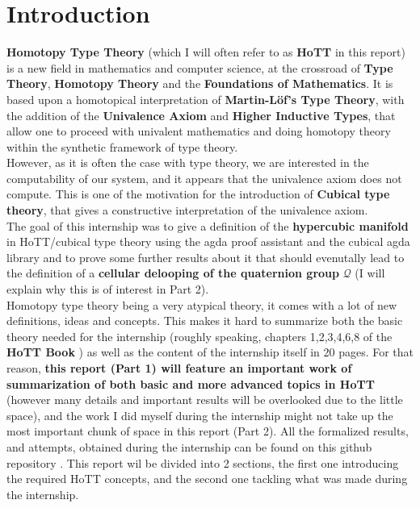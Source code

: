 \documentclass{report}
\begin{document}
\section{Introduction}
\textbf{Homotopy Type Theory} (which I will often refer to as \textbf{HoTT} in this report) is a new field in mathematics and computer science, at the crossroad of \textbf{Type Theory}, \textbf{Homotopy Theory} and the \textbf{Foundations of Mathematics}. It is based upon a homotopical interpretation of \textbf{Martin-Löf's Type Theory}, with the addition of the \textbf{Univalence Axiom} and \textbf{Higher Inductive Types}, that allow one to proceed with univalent mathematics and doing homotopy theory within the synthetic framework of type theory.\\
However, as it is often the case with type theory, we are interested in the computability of our system, and it appears that the univalence axiom does not compute. This is one of the motivation for the introduction of \textbf{Cubical type theory}, that gives a constructive interpretation of the univalence axiom.\\
The goal of this internship was to give a definition of the \textbf{hypercubic manifold} \cite{hypercubic} in HoTT/cubical type theory using the agda proof assistant and the cubical agda library \cite{cubicalagda} and to prove some further results about it that should evenutally lead to the definition of a \textbf{cellular delooping of the quaternion group} $\mathcal Q$ (I will explain why this is of interest in Part 2).\\
Homotopy type theory being a very atypical theory, it comes with a lot of new definitions, ideas and concepts. This makes it hard to summarize both the basic theory needed for the internship (roughly speaking, chapters 1,2,3,4,6,8 of the \textbf{HoTT Book} \cite{hott}) as well as the content of the internship itself in 20 pages. For that reason, \textbf{this report (Part 1) will feature an important work of summarization of both basic and more advanced topics in HoTT} (however many details and important results will be overlooked due to the little space), and the work I did myself during the internship might not take up the most important chunk of space in this report (Part 2). All the formalized results, and attempts, obtained during the internship can be found on this github repository \cite{repo}. This report wil be divided into 2 sections, the first one introducing the required HoTT concepts, and the second one tackling what was made during the internship.
\end{document}
